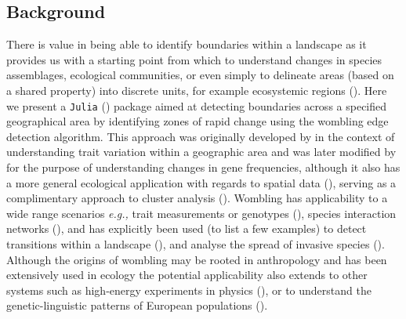 \begin{refsection}
\section{Background}\label{background}

There is value in being able to identify boundaries within a landscape
as it provides us with a starting point from which to understand changes
in species assemblages, ecological communities, or even simply to
delineate areas (based on a shared property) into discrete units, for
example ecosystemic regions (\cite{Post2007ProBou, Fortin2000IssRel}).
Here we present a \texttt{Julia} (\cite{Bezanson2017Julia}) package aimed
at detecting boundaries across a specified geographical area by
identifying zones of rapid change using the wombling edge detection
algorithm. This approach was originally developed by \cite{Womble1951DifSys}
in the context of understanding trait variation within a geographic area
and was later modified by \cite{Barbujani1989DetReg} for the purpose of
understanding changes in gene frequencies, although it also has a more
general ecological application with regards to spatial data
(\cite{Fortin2005SpaAna}), serving as a complimentary approach to cluster
analysis (\cite{Fortin1995DelEco}). Wombling has applicability to a wide
range scenarios \emph{e.g.,} trait measurements or genotypes
(\cite{Barbujani1989DetReg}), species interaction networks
(\cite{Fortin2021Network}), and has explicitly been used (to list a few
examples) to detect transitions within a landscape
(\cite{Philibert2008SpaStr, Camarero2000BouDet}), and analyse the spread
of invasive species (\cite{Fitzpatrick2010EcoBou}). Although the origins
of wombling may be rooted in anthropology and has been extensively used
in ecology the potential applicability also extends to other systems
such as high-energy experiments in physics (\cite{Matchev2020FinWom}), or
to understand the genetic-linguistic patterns of European populations
(\cite{Sokal1990GenLan}).


\end{refsection}
